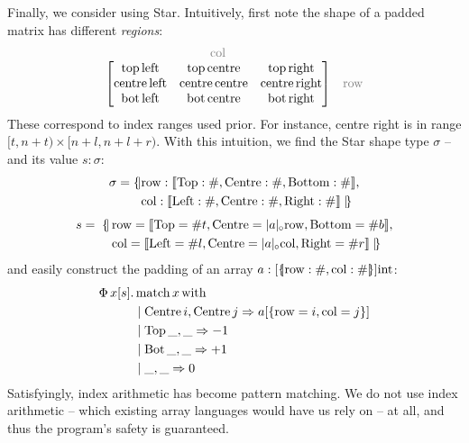 \noindent
Finally, we consider using Star. Intuitively, first note the shape of a padded matrix has different \textit{regions}:
$$ \vspace{-0.5em} 
\begin{matrix}
{\color{gray} \mathrm{col}} & \\
\begin{bmatrix}
\mathrm{top\, left} & \mathrm{top\, centre} & \mathrm{top\, right} \\
\mathrm{centre\, left} & \mathrm{centre\, centre} & \mathrm{centre\, right} \\
\mathrm{bot\, left} & \mathrm{bot\, centre} & \mathrm{bot\, right} \\
\end{bmatrix} & {\color{gray} \mathrm{row}} 
\end{matrix} $$
These correspond to index ranges used prior. For instance, centre right is in range $[t, n + t) \times [n + l, n + l + r)$.
With this intuition, we find the Star shape type $\sigma$ -- and its value $s : \sigma$:
\begin{align*}
\sigma =  \{\!\mid  &\mathrm{row}: \sconcattype{\mathrm{Top}: \ssized, \mathrm{Centre}: \ssized,\mathrm{Bottom}: \ssized}, \\ 
&\mathrm{col} : \sconcattype{\mathrm{Left}: \ssized, \mathrm{Centre}: \ssized,\mathrm{Right}: \ssized} \mid\!\} 
\end{align*}
\vspace{-2em}
\begin{align*}
s =\; \{\!\mid &\,\mathrm{row}= \sconcatval{\mathrm{Top}= \ssize t, \mathrm{Centre}= \sproductproj{\sshape{a}}{\mathrm{row}}, \mathrm{Bottom}= \ssize b}, \\ 
&\,\mathrm{col}= \sconcatval{ \mathrm{Left}= \ssize l, \mathrm{Centre}= \sproductproj{\sshape{a}}{\mathrm{col}}, \mathrm{Right}= \ssize r} \mid\!\}
\end{align*}
and easily construct the padding of an array $a : [\sproducttype{\mathrm{row} : \ssized,\mathrm{col} : \ssized }] \mathrm{int} $:
\begin{align*}
\Phi\, x[s] \ldotp&\, \mathrm{match}\,x\,\mathrm{with} \\
&\mid \mathrm{Centre}\,i, \mathrm{Centre}\,j \Rightarrow a[\srecordval{ \mathrm{row}= i, \mathrm{col}= j }] \\
&\mid \mathrm{Top}\,\_, \_ \Rightarrow -1 \\
&\mid \mathrm{Bot}\,\_, \_ \Rightarrow +1  \\
&\mid \_, \_ \Rightarrow 0
\end{align*}
Satisfyingly, index arithmetic has become pattern matching. We do not use index arithmetic -- which existing array languages would have us rely on -- at all, and thus the program's safety is guaranteed.


